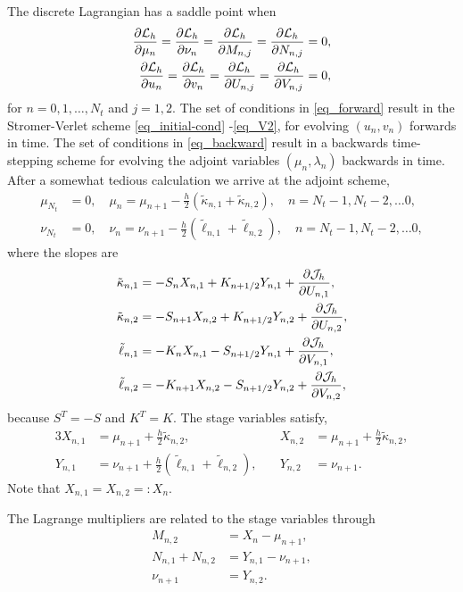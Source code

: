 \documentclass[11pt]{article}
\begin{document}
The discrete Lagrangian has a saddle point when
\begin{align}
  \frac{\partial{\cal L}_h}{\partial \mu_n} =
  \frac{\partial{\cal L}_h}{\partial \nu_n} =
  \frac{\partial{\cal L}_h}{\partial M_{n,j}} =
  \frac{\partial{\cal L}_h}{\partial N_{n,j}} &= 0,\label{eq_forward}\\
  \frac{\partial{\cal L}_h}{\partial u_n} =
  \frac{\partial{\cal L}_h}{\partial v_n} =
  \frac{\partial{\cal L}_h}{\partial U_{n,j}} =
  \frac{\partial{\cal L}_h}{\partial V_{n,j}} &= 0,\label{eq_backward}
\end{align}
for $n=0,1,\ldots,N_t$ and $j=1,2$. The set of conditions in \eqref{eq_forward} result in the
Stromer-Verlet scheme \eqref{eq_initial-cond} -\eqref{eq_V2}, for evolving $(u_n, v_n)$ forwards in
time. The set of conditions in \eqref{eq_backward} result in a backwards time-stepping scheme
for evolving the adjoint variables $(\mu_n, \lambda_n)$ backwards in time. After a
somewhat tedious calculation we arrive at the adjoint scheme,
\begin{align}
  \mu_{N_t} &= 0,\quad \mu_n = \mu_{n+1} - \frac{h}{2} \left(\tilde\kappa_{n,1} +
  \tilde\kappa_{n,2}\right),\quad n=N_t -1, N_t - 2, \ldots 0,\label{eq_mu}\\
  \nu_{N_t} &= 0,\quad \nu_{n} = \nu_{n+1} - \frac{h}{2} \left( \tilde\ell_{n,1} + \tilde\ell_{n,2} \right),\quad n=N_t -1, N_t -2, \ldots 0,
\end{align}
where the slopes are
\begin{align}
\tilde\kappa_{n,1} &= -S_n X_{n,1} + K_{n+1/2} Y_{n,1} + \frac{\partial {\cal J}_h}{\partial U_{n,1}} ,\\
\tilde\kappa_{n,2} &= -S_{n+1} X_{n,2} + K_{n+1/2} Y_{n,2}  + \frac{\partial {\cal J}_h}{\partial U_{n,2}},\\
\tilde\ell_{n,1} &= -K_{n} X_{n,1} - S_{n+1/2} Y_{n,1}  + \frac{\partial {\cal J}_h}{\partial V_{n,1}},\\
\tilde\ell_{n,2} &= -K_{n+1} X_{n,2} - S_{n+1/2} Y_{n,2}  + \frac{\partial {\cal J}_h}{\partial V_{n,2}},
\end{align}
because $S^T = -S$ and $K^T = K$. The stage variables satisfy,
\begin{alignat}{3}
  X_{n,1} &= \mu_{n+1} + \frac{h}{2} \tilde\kappa_{n,2},\quad
  &X_{n,2} & = \mu_{n+1} + \frac{h}{2} \tilde\kappa_{n,2},\\
  Y_{n,1} &= \nu_{n+1} +\frac{h}{2} \left( \tilde\ell_{n,1} + \tilde\ell_{n,2} \right),\quad
  &Y_{n,2} &= \nu_{n+1}.\label{eq_Y2}
\end{alignat}
Note that $X_{n,1}=X_{n,2} =: X_n$.

The Lagrange multipliers are related to the stage variables through
\begin{align}
  M_{n,2} &= X_{n} - \mu_{n+1},\label{eq_MX}\\
  N_{n,1} + N_{n,2} &= Y_{n,1} - \nu_{n+1},\label{eq_NY1}\\
  \nu_{n+1} &= Y_{n,2}.\label{eq_NY2}
\end{align}
\end{document}
